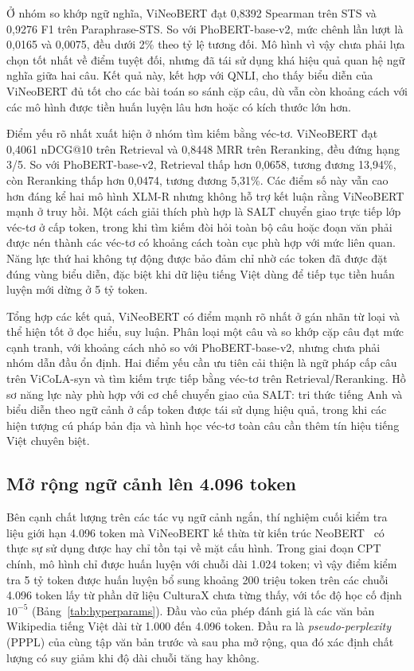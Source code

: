 Ở nhóm so khớp ngữ nghĩa, ViNeoBERT đạt 0,8392 Spearman trên STS và 0,9276 F1 trên
Paraphrase-STS. So với PhoBERT-base-v2, mức chênh lần lượt là 0,0165 và 0,0075, đều
dưới 2\% theo tỷ lệ tương đối. Mô hình vì vậy chưa phải lựa chọn tốt nhất về điểm tuyệt
đối, nhưng đã tái sử dụng khá hiệu quả quan hệ ngữ nghĩa giữa hai câu. Kết quả này, kết
hợp với QNLI, cho thấy biểu diễn của ViNeoBERT đủ tốt cho các bài toán so sánh cặp câu,
dù vẫn còn khoảng cách với các mô hình được tiền huấn luyện lâu hơn hoặc có kích thước
lớn hơn.

Điểm yếu rõ nhất xuất hiện ở nhóm tìm kiếm bằng véc-tơ. ViNeoBERT đạt 0,4061 nDCG@10
trên Retrieval và 0,8448 MRR trên Reranking, đều đứng hạng 3/5. So với
PhoBERT-base-v2, Retrieval thấp hơn 0,0658, tương đương 13,94\%, còn Reranking thấp hơn
0,0474, tương đương 5,31\%. Các điểm số này vẫn cao hơn đáng kể hai mô hình XLM-R nhưng
không hỗ trợ kết luận rằng ViNeoBERT mạnh ở truy hồi. Một cách giải thích phù hợp là
SALT chuyển giao trực tiếp lớp véc-tơ ở cấp token, trong khi tìm kiếm đòi hỏi toàn bộ câu
hoặc đoạn văn phải được nén thành các véc-tơ có khoảng cách toàn cục phù hợp với mức
liên quan. Năng lực thứ hai không tự động được bảo đảm chỉ nhờ các token đã được đặt đúng
vùng biểu diễn, đặc biệt khi dữ liệu tiếng Việt dùng để tiếp tục tiền huấn luyện mới dừng
ở 5 tỷ token.

Tổng hợp các kết quả, ViNeoBERT có điểm mạnh rõ nhất ở gán nhãn từ loại và thể hiện tốt
ở đọc hiểu, suy luận. Phân loại một câu và so khớp cặp câu đạt mức cạnh tranh, với khoảng
cách nhỏ so với PhoBERT-base-v2, nhưng chưa phải nhóm dẫn đầu ổn định. Hai điểm yếu cần
ưu tiên cải thiện là ngữ pháp cấp câu trên ViCoLA-syn và tìm kiếm trực tiếp bằng
véc-tơ trên Retrieval/Reranking. Hồ sơ năng lực này phù hợp với cơ chế chuyển giao
của SALT: tri thức tiếng Anh và biểu diễn theo ngữ cảnh ở cấp token được tái sử dụng
hiệu quả, trong khi các hiện tượng cú pháp bản địa và hình học véc-tơ toàn câu cần
thêm tín hiệu tiếng Việt chuyên biệt.

\subsection{Mở rộng ngữ cảnh lên 4.096 token}
\label{subsec:exp-ctx4096}

Bên cạnh chất lượng trên các tác vụ ngữ cảnh ngắn, thí nghiệm cuối kiểm tra liệu giới
hạn 4.096 token mà ViNeoBERT kế thừa từ kiến trúc
NeoBERT~\cite{lebreton2025neobert} có thực sự sử dụng được hay chỉ tồn tại về mặt cấu
hình. Trong giai đoạn CPT chính, mô hình chỉ được huấn luyện với chuỗi dài 1.024 token;
vì vậy điểm kiểm tra 5 tỷ token được huấn luyện bổ sung khoảng 200 triệu token trên các
chuỗi 4.096 token lấy từ phần dữ liệu CulturaX chưa từng thấy, với tốc độ học cố định
$10^{-5}$ (Bảng~\ref{tab:hyperparams}). Đầu vào của phép đánh giá là các văn bản
Wikipedia tiếng Việt dài từ 1.000 đến 4.096 token. Đầu ra là
\textit{pseudo-perplexity} (PPPL) của cùng tập văn bản trước và sau pha mở rộng, qua đó
xác định chất lượng có suy giảm khi độ dài chuỗi tăng hay không.

